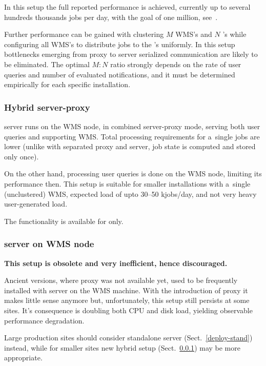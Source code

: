 In this setup the full reported performance is achieved,
currently up to several hundreds thousands jobs per day, with the goal
of one million, see~\cite{lbtp}.

Further performance can be gained with clustering $M$ WMS's and $N$ \LB's
while configuring all WMS's to distribute jobs to the \LB's uniformly.
In this setup bottlenecks emerging from \LB proxy to \LB server serialized
communication are likely to be eliminated.
The optimal $M:N$ ratio strongly depends on the rate of user queries
and number of evaluated notifications,
and it must be determined empirically for each specific installation.

\subsubsection{Hybrid \LB server-proxy}
\label{deploy-hybrid}

\LB server runs on the WMS node, in combined server-proxy mode,
serving both user queries and supporting WMS.
Total processing requirements for a~single jobs are lower
(unlike with separated proxy and server, job state is computed and stored only once).

On the other hand, processing user queries is done on the WMS node,
limiting its performance then.
This setup is suitable for smaller installations with a~single (unclustered)
WMS, expected load of upto 30--50 kjobs/day, and not very heavy user-generated
load.

The functionality is available for \LBnew only.


\subsubsection{\LB server on WMS node}

\textbf{This setup is obsolete and very inefficient, hence discouraged.}

Ancient \LB versions, where \LB proxy was not available yet,
used to be frequently installed with \LB server on the WMS machine.
With the introduction of \LB proxy it makes little sense anymore
but, unfortunately, this setup still persists at some sites.
It's consequence is doubling both CPU and disk load, yielding observable
performance degradation.

Large production sites should consider standalone \LB server (Sect.~\ref{deploy-stand})
instead, while for smaller sites new hybrid setup (Sect.~\ref{deploy-hybrid}) may
be more appropriate.
